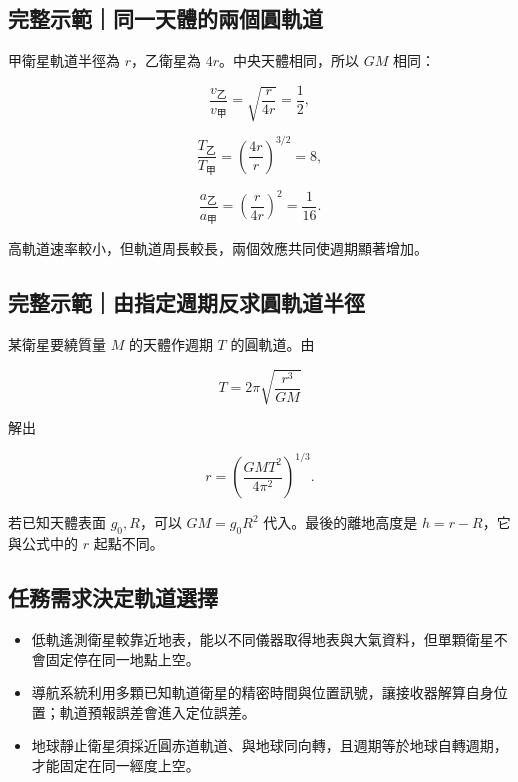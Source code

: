 \documentclass[11pt,a4paper]{article}
\providecommand{\tightlist}{%
  \setlength{\itemsep}{0pt}\setlength{\parskip}{0pt}}
\begin{document}
\begin{HandoutWorkedExample}

\subsection{完整示範｜同一天體的兩個圓軌道}\label{ux5b8cux6574ux793aux7bc4ux540cux4e00ux5929ux9ad4ux7684ux5169ux500bux5713ux8eccux9053}

甲衛星軌道半徑為 \(r\)，乙衛星為 \(4r\)。中央天體相同，所以 \(GM\) 相同：

\[
\frac{v_{\text{乙}}}{v_{\text{甲}}}
=\sqrt{\frac{r}{4r}}
=\frac12,
\]

\[
\frac{T_{\text{乙}}}{T_{\text{甲}}}
=\left(\frac{4r}{r}\right)^{3/2}
=8,
\]

\[
\frac{a_{\text{乙}}}{a_{\text{甲}}}
=\left(\frac{r}{4r}\right)^2
=\frac1{16}.
\]

高軌道速率較小，但軌道周長較長，兩個效應共同使週期顯著增加。

\end{HandoutWorkedExample}

\begin{HandoutWorkedExample}

\subsection{完整示範｜由指定週期反求圓軌道半徑}\label{ux5b8cux6574ux793aux7bc4ux7531ux6307ux5b9aux9031ux671fux53cdux6c42ux5713ux8eccux9053ux534aux5f91}

某衛星要繞質量 \(M\) 的天體作週期 \(T\) 的圓軌道。由

\[
T=2\pi\sqrt{\frac{r^3}{GM}}
\]

解出

\[
\boxed{r=\left(\frac{GMT^2}{4\pi^2}\right)^{1/3}}.
\]

若已知天體表面 \(g_0,R\)，可以 \(GM=g_0R^2\) 代入。最後的離地高度是 \(h=r-R\)，它與公式中的 \(r\) 起點不同。

\end{HandoutWorkedExample}

\subsection{任務需求決定軌道選擇}\label{ux4efbux52d9ux9700ux6c42ux6c7aux5b9aux8eccux9053ux9078ux64c7}

\begin{itemize}
\tightlist
\item
  低軌遙測衛星較靠近地表，能以不同儀器取得地表與大氣資料，但單顆衛星不會固定停在同一地點上空。
\item
  導航系統利用多顆已知軌道衛星的精密時間與位置訊號，讓接收器解算自身位置；軌道預報誤差會進入定位誤差。
\item
  地球靜止衛星須採近圓赤道軌道、與地球同向轉，且週期等於地球自轉週期，才能固定在同一經度上空。
\end{itemize}
\end{document}

